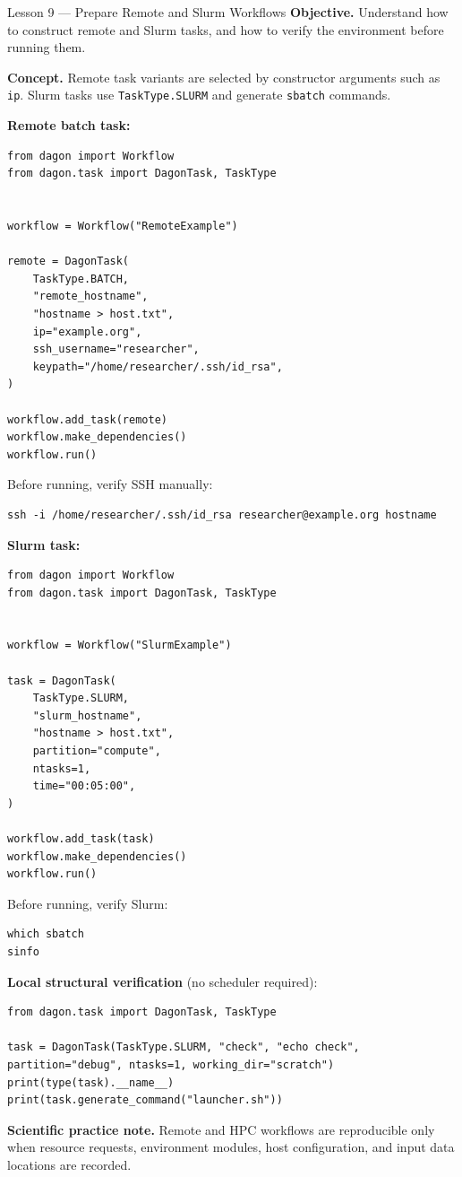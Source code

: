 \begin{lessonbox}{Lesson 9 --- Prepare Remote and Slurm Workflows}
\textbf{Objective.} Understand how to construct remote and Slurm tasks, and
how to verify the environment before running them.

\textbf{Concept.} Remote task variants are selected by constructor arguments
such as \texttt{ip}. Slurm tasks use \texttt{TaskType.SLURM} and generate
\texttt{sbatch} commands.

\textbf{Remote batch task:}
\begin{lstlisting}
from dagon import Workflow
from dagon.task import DagonTask, TaskType


workflow = Workflow("RemoteExample")

remote = DagonTask(
    TaskType.BATCH,
    "remote_hostname",
    "hostname > host.txt",
    ip="example.org",
    ssh_username="researcher",
    keypath="/home/researcher/.ssh/id_rsa",
)

workflow.add_task(remote)
workflow.make_dependencies()
workflow.run()
\end{lstlisting}

Before running, verify SSH manually:
\begin{lstlisting}[style=bash]
ssh -i /home/researcher/.ssh/id_rsa researcher@example.org hostname
\end{lstlisting}

\textbf{Slurm task:}
\begin{lstlisting}
from dagon import Workflow
from dagon.task import DagonTask, TaskType


workflow = Workflow("SlurmExample")

task = DagonTask(
    TaskType.SLURM,
    "slurm_hostname",
    "hostname > host.txt",
    partition="compute",
    ntasks=1,
    time="00:05:00",
)

workflow.add_task(task)
workflow.make_dependencies()
workflow.run()
\end{lstlisting}

Before running, verify Slurm:
\begin{lstlisting}[style=bash]
which sbatch
sinfo
\end{lstlisting}

\textbf{Local structural verification} (no scheduler required):
\begin{lstlisting}
from dagon.task import DagonTask, TaskType

task = DagonTask(TaskType.SLURM, "check", "echo check", partition="debug", ntasks=1, working_dir="scratch")
print(type(task).__name__)
print(task.generate_command("launcher.sh"))
\end{lstlisting}

\textbf{Scientific practice note.} Remote and HPC workflows are reproducible
only when resource requests, environment modules, host configuration, and
input data locations are recorded.
\end{lessonbox}


